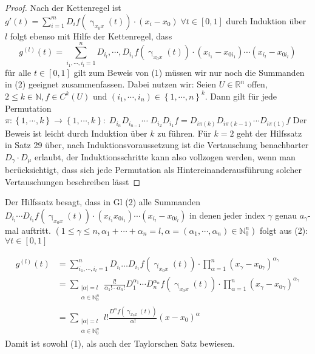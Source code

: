 \begin{proof}
	Nach der Kettenregel ist $ g' \left(t\right) = \sum_{i=1}^{m}D_i f \left( \upgamma_{x_0x} \left(t\right)  \right) \cdot 
	\left( x_i-x_0 \right) \; \forall t \in [0,1]$ durch Induktion über $ l $ folgt ebenso mit Hilfe der Kettenregel, dass 
	\begin{equation}
		g^{\left(l\right) } \left(t\right) = \sum_{i_1, \cdots,  i_l = 1}^{n} D_{i_{l}} , \cdots,  D_{i_{1}} f \left( \upgamma_{x_0x}
		\left(t\right) \right) \cdot \left( x_{i_1} - x_{0i_1} \right) \cdots \left( x_{i_{l}} - x_{0i_{l}} \right) 
	\tag{2}
	\end{equation}
	für alle $ t \in [0,1] $ gilt zum Beweis von (1) müssen wir nur noch die Summanden in (2) geeignet zusammenfassen. Dabei nutzen wir:
Seien $ U \in \mathbb{R}^n  $ offen, $ 2 \leq  k \in \mathbb{N}, f \in C^{k} \left(U\right)  \text{ und }  \left( i_1 , \cdots,  i_{n} 
\right) \in \left\{ 1, \cdots,  n \right\} ^{k} $. Dann gilt für jede Permutation $ \pi : \left\{ 1, \cdots,  k \right\} \to 
\left\{ 1, \cdots,  k \right\} : \; D_{i_{n}} D_{i_{n-1}}  \cdots \; D_{i_2} D_{i_1} f = D_{i \pi \left(k\right) } D_{i \pi (k-1)} 
 \cdots D_{i \pi (1)} f  $ 
 \parskip=3pt
 Der Beweis ist leicht durch Induktion über $ k $ zu führen. Für $ k=2 $ geht der Hilfssatz in Satz 29 über, nach Induktionsvoraussetzung
 ist die Vertauschung benachbarter $ D_{\gamma } \cdot D_{\mu}$ erlaubt, der Induktionsschritte kann also vollzogen werden, wenn man 
 berücksichtigt, dass sich jede Permutation als Hintereinanderausführung solcher Vertauschungen beschreiben lässt
\end{proof}

Der Hilfssatz besagt, dass in Gl (2) alle Summanden $ D_{i_{l}} \cdots D_{i_1} f \left( \upgamma_{x_0x} \left(t\right)  \right) 
\cdot \left( x_{i_1} x_{0i_1} \right) \cdots \left( x_{i_{l}} - x_{0i_{l}} \right)   $ in denen jeder index $ \gamma  $ genau 
$ a_{\gamma }$-mal auftritt. $ \left( 1 \leq  \gamma  \leq n , \alpha_1 + \cdots + \alpha_n = l, \alpha = 
\left( \alpha_1 , \cdots,  \alpha_n \right) \in  \mathbb{N} _{0}^{n}\right)  $ folgt aus (2): $ \forall t \in [0,1] $ 

\begin{align*}
	g^{\left(l\right) }\left(t\right)  &= \sum_{i_1 , \cdots,  i_{l} = 1}^{n} D_{i_{l}} \dots D_{i_1} f \left( \upgamma_{x_0x}(t)\right) 
	\cdot \prod_{\alpha  = 1}^{n} \left( x_{\gamma } - x_{0 \gamma } \right) ^{\alpha _{\gamma }} \\
	&= \sum_{ \substack{ |\alpha | = l \\ \alpha \in \mathbb{N}_{0}^{n} }} \frac{l !}{\alpha_1 ! \cdots \alpha_n !} D_{1}^{\alpha_1}
	\cdots D_{n}^{\alpha_n} f \left( \upgamma_{x_0x} \left(t\right)  \right) \cdot \prod_{\alpha = 1}^{n} \left( 
		x_\gamma - x_{0 \gamma }\right)^{\alpha_{\gamma }}  \\
		&= \sum_{ \substack{ |\alpha | = l \\ \alpha \in \mathbb{N}_{0}^{n} }} l ! \frac{D^{\alpha }f \left( \upgamma_{x_0x} 
		\left(t\right) \right) }{\alpha !} \left( x - x_0 \right)^{\alpha }
\end{align*}
Damit ist sowohl (1), als auch der Taylorschen Satz bewiesen.


%

